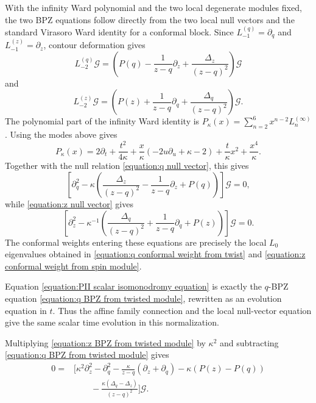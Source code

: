 \documentclass[a4paper,11pt]{article}
\numberwithin{equation}{section}
\begin{document}
With the infinity Ward polynomial and the two local degenerate modules fixed, the two BPZ equations follow directly from the two local null vectors and
the standard Virasoro Ward identity for a conformal block.  Since
$L_{-1}^{(q)}=\partial_{q}$ and $L_{-1}^{(z)}=\partial_{z}$, contour deformation
gives
\begin{equation}
	L_{-2}^{(q)}\mathcal{G}
	=
	\left(
	P(q)
	-
	\frac{1}{z-q}\partial_{z}
	+
	\frac{\Delta_{z}}{(z-q)^{2}}
	\right)\mathcal{G}
\end{equation}
and
\begin{equation}
	L_{-2}^{(z)}\mathcal{G}
	=
	\left(
	P(z)
	+
	\frac{1}{z-q}\partial_{q}
	+
	\frac{\Delta_{q}}{(z-q)^{2}}
	\right)\mathcal{G}.
\end{equation}
The polynomial part of the infinity Ward identity is
$P_{\kappa}(x)=\sum_{n=2}^{6}x^{n-2}L_{n}^{(\infty)}$.  Using the modes above gives
\begin{equation}
		\label{equation:irregular Ward polynomial}
		P_{\kappa}(x)
		=
  2\partial_{t}+\frac{t^{2}}{4\kappa}
  +\frac{x}{\kappa}\left(-2u\partial_{u}+\kappa-2\right)
  +\frac{t}{\kappa}x^{2}+\frac{x^{4}}{\kappa}.
\end{equation}
Together with the null relation \eqref{equation:q null vector}, this gives
\begin{equation}
	\label{equation:q BPZ from twisted module}
	\left[
	\partial_{q}^{2}
	-
	\kappa
	\left(
	\frac{\Delta_{z}}{(z-q)^{2}}
	-
	\frac{1}{z-q}\partial_{z}
	+
	P(q)
	\right)
	\right]\mathcal{G}
	=
	0,
\end{equation}
while \eqref{equation:z null vector} gives
\begin{equation}
	\label{equation:z BPZ from twisted module}
	\left[
	\partial_{z}^{2}
	-
	\kappa^{-1}
	\left(
	\frac{\Delta_{q}}{(z-q)^{2}}
	+
	\frac{1}{z-q}\partial_{q}
	+
	P(z)
	\right)
	\right]\mathcal{G}
	=
	0.
\end{equation}
The conformal weights entering these equations are precisely the local
$L_{0}$ eigenvalues obtained in
\eqref{equation:q conformal weight from twist} and
\eqref{equation:z conformal weight from spin module}.

Equation \eqref{equation:PII scalar isomonodromy equation} is exactly the $q$-BPZ equation
\eqref{equation:q BPZ from twisted module}, rewritten as an evolution equation in $t$.
Thus the affine family connection and the local null-vector equation
give the same scalar time evolution in this normalization.


Multiplying \eqref{equation:z BPZ from twisted module} by $\kappa^{2}$ and
subtracting \eqref{equation:q BPZ from twisted module} gives
\begin{equation}
	\begin{aligned}
		0
		={}&
		\Bigg[
		\kappa^{2}\partial_{z}^{2}
		-
		\partial_{q}^{2}
		-
		\frac{\kappa}{z-q}
		\left(
		\partial_{z}+\partial_{q}
		\right)
		-
		\kappa\left(P(z)-P(q)\right)
		\\
		&\qquad
		-
		\frac{\kappa(\Delta_{q}-\Delta_{z})}{(z-q)^{2}}
		\Bigg]\mathcal{G}.
	\end{aligned}
\end{equation}
\end{document}

